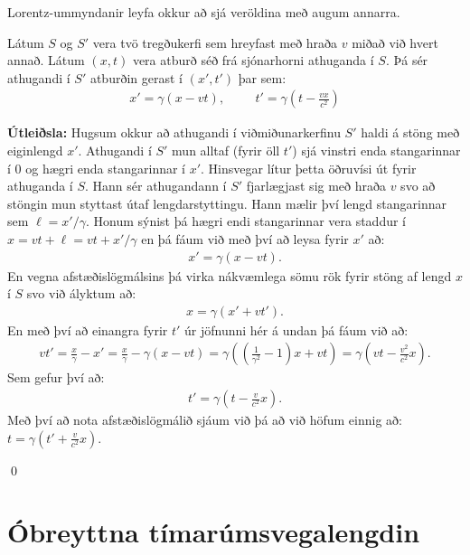 \ifdefined \wholebook \else\documentclass[oneside]{book}\usepackage{EdlBook}\graphicspath{{figures/}}
\begin{document}
Lorentz-ummyndanir leyfa okkur að sjá veröldina með augum annarra.

\begin{tcolorbox}
\begin{theorem}
Látum $S$ og $S'$ vera tvö tregðukerfi sem hreyfast með hraða $v$ miðað við hvert annað. Látum $(x,t)$ vera atburð séð frá sjónarhorni athuganda í $S$. Þá sér athugandi í $S'$ atburðin gerast í $(x',t')$ þar sem:
\begin{align*}
    x' = \gamma (x - vt), \hspace{1cm} t' = \gamma \left( t - \frac{vx}{c^2} \right)
\end{align*}
\end{theorem}
\end{tcolorbox}

\textbf{Útleiðsla:} Hugsum okkur að athugandi í viðmiðunarkerfinu $S'$ haldi á stöng með eiginlengd $x'$. Athugandi í $S'$ mun alltaf (fyrir öll $t'$) sjá vinstri enda stangarinnar í $0$ og hægri enda stangarinnar í $x'$. Hinsvegar lítur þetta öðruvísi út fyrir athuganda í $S$. Hann sér athugandann í $S'$ fjarlægjast sig með hraða $v$ svo að stöngin mun styttast útaf lengdarstyttingu. Hann mælir því lengd stangarinnar sem $\ell = x'/\gamma$. Honum sýnist þá hægri endi stangarinnar vera staddur í $x = vt + \ell = vt + x'/\gamma$ en þá fáum við með því að leysa fyrir $x'$ að:
\begin{align*}
    x' = \gamma\left(x- vt\right).
\end{align*}
En vegna afstæðislögmálsins þá virka nákvæmlega sömu rök fyrir stöng af lengd $x$ í $S$ svo við ályktum að:
\begin{align*}
    x = \gamma \left(x' + vt' \right).
\end{align*}
En með því að einangra fyrir $t'$ úr jöfnunni hér á undan þá fáum við að:
\begin{align*}
    vt' = \frac{x}{\gamma} - x' = \frac{x}{\gamma} - \gamma \left( x - vt \right) = \gamma \left( \left( \frac{1}{\gamma^2} - 1 \right)x + vt\right) = \gamma \left( vt - \frac{v^2}{c^2}x \right).
\end{align*}
Sem gefur því að:
\begin{align*}
    t' = \gamma \left( t - \frac{v}{c^2}x \right).
\end{align*}
Með því að nota afstæðislögmálið sjáum við þá að við höfum einnig að: $t = \gamma \left( t' + \frac{v}{c^2}x \right)$.

\qed

\section{Óbreyttna tímarúmsvegalengdin}
\end{document}
